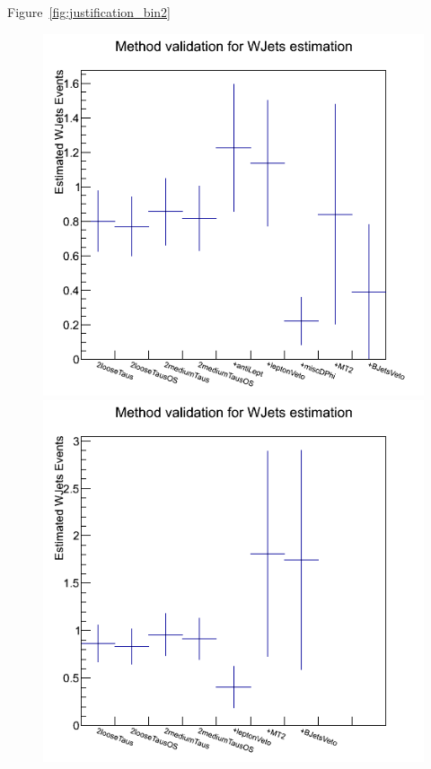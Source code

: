 Figure~\ref{fig:justification_bin2}  
\begin{figure}[htbp]
\centering
\includegraphics[angle=0,scale=0.35]{TauTauFigs/WJetsEst_bin2.png}
\includegraphics[angle=0,scale=0.35]{TauTauFigs/WJetsEst_bin2_miscApplied.png} \\

\end{figure}
